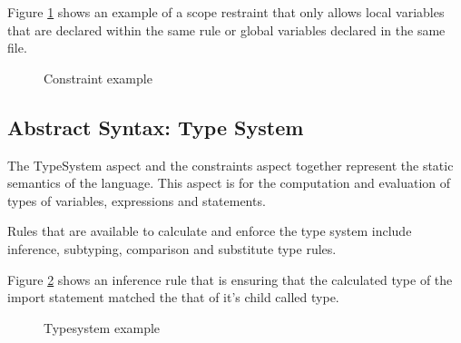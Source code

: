 Figure \ref{fig:constraint_example} shows an example of a scope restraint that only allows local variables that are declared within the same rule or global variables declared in the same file.

\begin{figure}[h]
    \centering
    \caption{Constraint example}
    \label{fig:constraint_example}
\end{figure}
 

\subsection{Abstract Syntax: Type System}
The TypeSystem aspect and the constraints aspect together represent the static semantics of the language.
This aspect is for the computation and evaluation of types of variables, expressions and statements.

Rules that are available to calculate and enforce the type system include inference, subtyping, comparison and substitute type rules.

Figure \ref{fig:typesystem_example} shows an inference rule that is ensuring that the calculated type of the import statement matched the that of it's child called type.

\begin{figure}[h]
    \centering
    \caption{Typesystem example}
    \label{fig:typesystem_example}
\end{figure}
 

